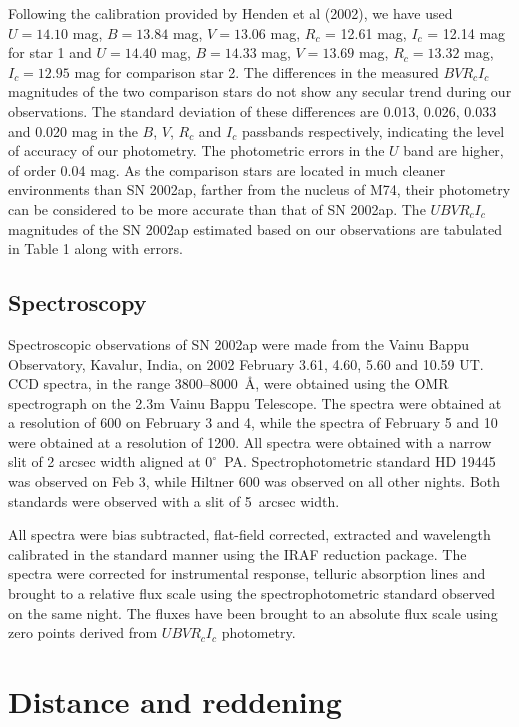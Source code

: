 Following the calibration provided by Henden et al (2002), we have used
$U = 14.10$ mag, $B = 13.84$ mag, $V = 13.06$ mag, $R_c$ = 12.61 mag, 
$I_c$ = 12.14 mag for star 1 and $U = 14.40$ mag, $B = 14.33$ mag, 
$V = 13.69$ mag, $R_c = 13.32$ mag, $I_c = 12.95$ mag for comparison star 2.
The differences in the measured $BVR_cI_c$ magnitudes of the two
comparison stars do not show any secular trend during our observations.
The standard deviation of these differences are 0.013, 0.026, 0.033 and
0.020 mag in the $B$, $V$, $R_c$ and $I_c$ passbands respectively, indicating 
the level of accuracy of our photometry. The photometric errors in the $U$ band
are higher, of order 0.04 mag. As the comparison stars are 
located in much cleaner environments than SN 2002ap, farther from the 
nucleus of M74, their photometry can be considered to be more accurate than 
that of SN 2002ap. The $UBVR_cI_c$ magnitudes of the SN 2002ap estimated based 
on our observations are tabulated in Table 1 along with errors.

\subsection{Spectroscopy}

Spectroscopic observations of SN 2002ap were made from the Vainu Bappu 
Observatory, Kavalur, India, on 2002 February 3.61, 4.60, 5.60 and 10.59 UT. CCD 
spectra, in the range 3800--8000~\AA, were obtained using the OMR spectrograph
on the 2.3m Vainu Bappu Telescope. The spectra were obtained at a resolution
of 600 on February 3 and 4, while the spectra of February 5 and 10 were 
obtained at a resolution of 1200. All spectra were obtained with a narrow slit 
of 2 arcsec width aligned at $0^\circ$~PA. Spectrophotometric standard
HD 19445 was observed on Feb 3, while Hiltner 600 was observed on all other
nights. Both standards were observed with a slit of 5~arcsec width. 

All spectra were bias subtracted, flat-field corrected, extracted and
wavelength calibrated in the standard manner using the IRAF
reduction package. The spectra were corrected for instrumental response,
 telluric absorption lines and brought to a relative flux scale using the 
spectrophotometric standard observed on the same 
night. The fluxes have been brought to an absolute flux scale
using zero points derived from $UBVR_cI_c$ photometry.

\section{Distance and reddening} 

